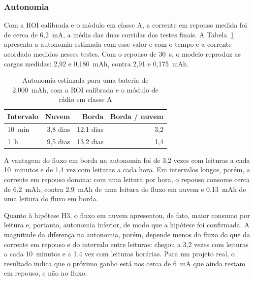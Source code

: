 \subsubsection{Autonomia}

Com a ROI calibrada e o módulo em classe A, a corrente em repouso medida foi de cerca de
6,2~mA, a média das duas corridas dos testes finais. A Tabela~\ref{tab:autonomia_classe_a} apresenta
a autonomia estimada com esse valor e com o tempo e a corrente acordado medidos nesses
testes. Com o repouso de 30~s, o modelo reproduz as cargas medidas: 2,92 e 0,180~mAh,
contra 2,91 e 0,175~mAh.

\begin{table}[H]
    \centering
    \caption{Autonomia estimada para uma bateria de 2.000~mAh, com a ROI calibrada e o módulo de rádio em classe A}
    \label{tab:autonomia_classe_a}
    \begin{tabular}{@{}lrrr@{}}
        \toprule
        \textbf{Intervalo} & \textbf{Nuvem} & \textbf{Borda} & \textbf{Borda / nuvem} \\
        \midrule
        10~min & 3,8 dias & 12,1 dias & 3,2 \\
        1~h    & 9,5 dias & 13,2 dias & 1,4 \\
        \bottomrule
    \end{tabular}
\end{table}

A vantagem do fluxo em borda na autonomia foi de 3,2 vezes com leituras a cada 10~minutos e
de 1,4 vez com leituras a cada hora. Em intervalos longos, porém, a corrente em repouso
domina: com uma leitura por hora, o repouso consome cerca de 6,2~mAh, contra 2,9~mAh de uma
leitura do fluxo em nuvem e 0,13~mAh de uma leitura do fluxo em borda.

Quanto à hipótese H3, o fluxo em nuvem apresentou, de fato, maior consumo por leitura e,
portanto, autonomia inferior, de modo que a hipótese foi confirmada. A magnitude da
diferença na autonomia, porém, depende menos do fluxo do que da corrente em repouso e do
intervalo entre leituras: chegou a 3,2 vezes com leituras a cada 10~minutos e a 1,4 vez com
leituras horárias. Para um projeto real, o resultado indica que o próximo ganho está nos
cerca de 6~mA que ainda restam em repouso, e não no fluxo.


